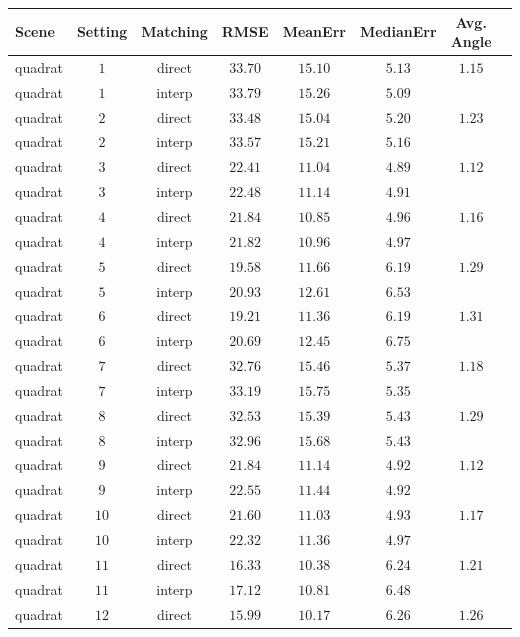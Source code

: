 \begin{table}[tb]
	\centering
		\begin{tabular}{lccccccc}
Scene & Setting & Matching & RMSE & MeanErr & MedianErr & Avg. Angle \\
\hline  \hline
quadrat & $1$ & direct & $33.70$ & $15.10$ & $5.13$ & $1.15$ & \\
quadrat & $1$ & interp & $33.79$ & $15.26$ & $5.09$ &  & \\
quadrat & $2$ & direct & $33.48$ & $15.04$ & $5.20$ & $1.23$ & \\
quadrat & $2$ & interp & $33.57$ & $15.21$ & $5.16$ &  & \\
quadrat & $3$ & direct & $22.41$ & $11.04$ & $4.89$ & $1.12$ & \\
quadrat & $3$ & interp & $22.48$ & $11.14$ & $4.91$ &  & \\
quadrat & $4$ & direct & $21.84$ & $10.85$ & $4.96$ & $1.16$ & \\
quadrat & $4$ & interp & $21.82$ & $10.96$ & $4.97$ &  & \\
quadrat & $5$ & direct & $19.58$ & $11.66$ & $6.19$ & $1.29$ & \\
quadrat & $5$ & interp & $20.93$ & $12.61$ & $6.53$ &  & \\
quadrat & $6$ & direct & $19.21$ & $11.36$ & $6.19$ & $1.31$ & \\
quadrat & $6$ & interp & $20.69$ & $12.45$ & $6.75$ &  & \\
quadrat & $7$ & direct & $32.76$ & $15.46$ & $5.37$ & $1.18$ & \\
quadrat & $7$ & interp & $33.19$ & $15.75$ & $5.35$ &  & \\
quadrat & $8$ & direct & $32.53$ & $15.39$ & $5.43$ & $1.29$ & \\
quadrat & $8$ & interp & $32.96$ & $15.68$ & $5.43$ &  & \\
quadrat & $9$ & direct & $21.84$ & $11.14$ & $4.92$ & $1.12$ & \\
quadrat & $9$ & interp & $22.55$ & $11.44$ & $4.92$ &  & \\
quadrat & $10$ & direct & $21.60$ & $11.03$ & $4.93$ & $1.17$ & \\
quadrat & $10$ & interp & $22.32$ & $11.36$ & $4.97$ &  & \\
quadrat & $11$ & direct & $16.33$ & $10.38$ & $6.24$ & $1.21$ & \\
quadrat & $11$ & interp & $17.12$ & $10.81$ & $6.48$ &  & \\
quadrat & $12$ & direct & $15.99$ & $10.17$ & $6.26$ & $1.26$ & \\

\end{tabular}
\end{table}
